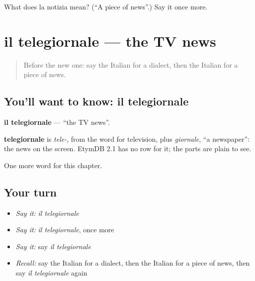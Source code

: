 \begin{tcolorbox}[breakable,colback=teal!4,colframe=teal!35!black,title={Before you move on}]
What does la notizia mean? (\textquotedblleft{}A piece of news\textquotedblright{}.) Say it once more.
\end{tcolorbox}
\section[il telegiornale]{il telegiornale — the TV news}

\label{lesson:IT-C249-telegiornale}



\begin{quote}
Before the new one: say the Italian for a dialect, then the Italian for a piece of news.
\end{quote}

\subsection*{You'll want to know: il telegiornale}
\textbf{il telegiornale} — \textquotedblleft{}the TV news\textquotedblright{}.

\begin{cousinweb}
\textbf{telegiornale} is \emph{tele-}, from the word for television, plus \emph{giornale}, \textquotedblleft{}a newspaper\textquotedblright{}: the news on the screen. EtymDB 2.1 has no row for it; the parts are plain to see.
\end{cousinweb}

\begin{grammarlens}[title={What you've built}]
One more word for this chapter.
\end{grammarlens}

\subsection*{Your turn}
\begin{itemize}
\raggedright
  \item \emph{Say it:} \emph{il telegiornale}
  \item \emph{Say it:} \emph{il telegiornale}, once more
  \item \emph{Say it:} say \emph{il telegiornale}
  \item \emph{Recall:} say the Italian for a dialect, then the Italian for a piece of news, then say \emph{il telegiornale} again
\end{itemize}

